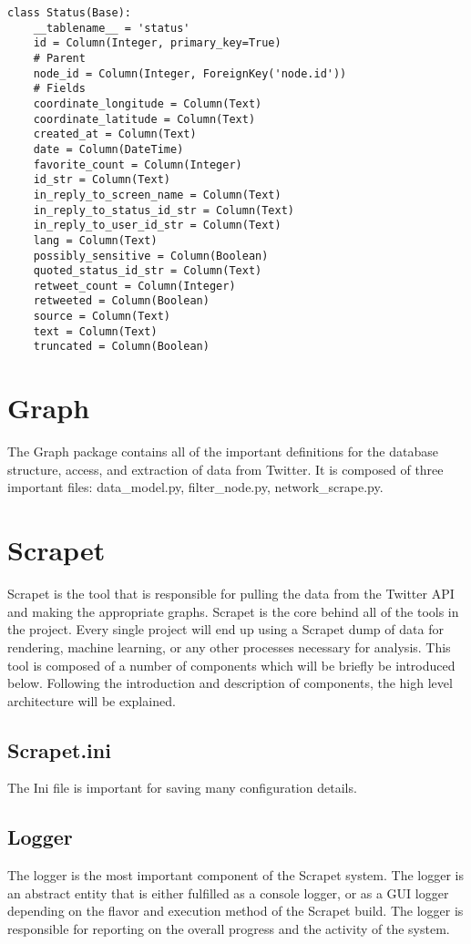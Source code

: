 \begin{lstlisting}
class Status(Base):
    __tablename__ = 'status'
    id = Column(Integer, primary_key=True)
    # Parent
    node_id = Column(Integer, ForeignKey('node.id'))
    # Fields
    coordinate_longitude = Column(Text)
    coordinate_latitude = Column(Text)
    created_at = Column(Text)
    date = Column(DateTime)
    favorite_count = Column(Integer)
    id_str = Column(Text)
    in_reply_to_screen_name = Column(Text)
    in_reply_to_status_id_str = Column(Text)
    in_reply_to_user_id_str = Column(Text)
    lang = Column(Text)
    possibly_sensitive = Column(Boolean)
    quoted_status_id_str = Column(Text)
    retweet_count = Column(Integer)
    retweeted = Column(Boolean)
    source = Column(Text)
    text = Column(Text)
    truncated = Column(Boolean)
\end{lstlisting}

\section{Graph}
The Graph package contains all of the important definitions for the
database structure, access, and extraction of data from Twitter. It is
composed of three important files: data\_model.py, filter\_node.py,
network\_scrape.py.


\section{Scrapet}
Scrapet is the tool that is responsible for pulling the data from the
Twitter API and making the appropriate graphs. Scrapet is the core
behind all of the tools in the project. Every single project will end
up using a Scrapet dump of data for rendering, machine learning, or
any other processes necessary for analysis. This tool is composed of a
number of components which will be briefly be introduced
below. Following the introduction and description of components, the
high level architecture will be explained.

\subsection{Scrapet.ini}
The Ini file is important for saving many configuration details.

\subsection{Logger}
The logger is the most important component of the Scrapet system. The
logger is an abstract entity that is either fulfilled as a console
logger, or as a GUI logger depending on the flavor and execution
method of the Scrapet build. The logger is responsible for reporting
on the overall progress and the activity of the system.


